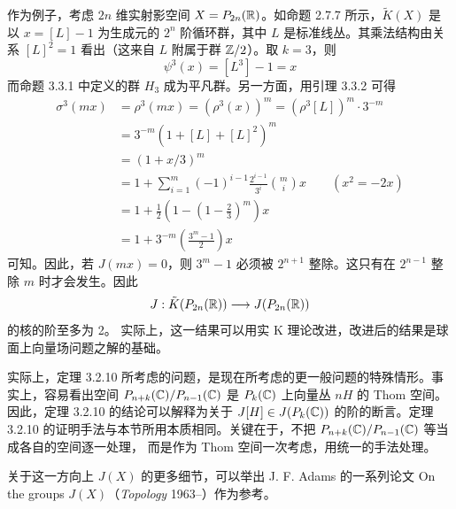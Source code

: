 作为例子，考虑 $2n$ 维实射影空间 $X=P_{2n}(\mathbb{R})$。如命题 2.7.7 所示，$\tilde K(X)$ 是以 $x=[L]-1$ 为生成元的 $2^n$ 阶循环群，其中 $L$ 是标准线丛。其乘法结构由关系 $[L]^2=1$ 看出（这来自 $L$ 附属于群 $\mathbb{Z}/2$）。取 $k=3$，则
\begin{equation*}
  \psi^3(x)=[L^3]-1=x
\end{equation*}
而命题 3.3.1 中定义的群 $H_3$ 成为平凡群。另一方面，用引理 3.3.2 可得
\begin{align*}
  \sigma^3(mx) &= \rho^3(mx)=(\rho^3(x))^m=(\rho^3[L])^m\cdot3^{-m} \\
  &= 3^{-m}(1+[L]+[L]^2)^m \\
  &= (1+x/3)^m \\
  &= 1+\sum_{i=1}^{m}(-1)^{i-1}\frac{2^{i-1}}{3^i}\binom{m}{i}x
    \qquad (x^2=-2x) \\
  &= 1+\frac12\left(1-\left(1-\frac23\right)^m\right)x \\
  &= 1+3^{-m}\left(\frac{3^m-1}{2}\right)x
\end{align*}
可知。因此，若 $J(mx)=0$，则 $3^m-1$ 必须被 $2^{n+1}$ 整除。这只有在 $2^{n-1}$ 整除 $m$ 时才会发生。因此
\begin{equation*}
  J:\tilde K(P_{2n}(\mathbb{R}))\longrightarrow J(P_{2n}(\mathbb{R}))
\end{equation*}
的核的阶至多为 2。
实际上，这一结果可以用实 K 理论改进，改进后的结果是球面上向量场问题之解的基础。

实际上，定理 3.2.10 所考虑的问题，是现在所考虑的更一般问题的特殊情形。事实上，容易看出空间 $P_{n+k}(\mathbb{C})/P_{n-1}(\mathbb{C})$ 是 $P_k(\mathbb{C})$ 上向量丛 $nH$ 的 Thom 空间。因此，定理 3.2.10 的结论可以解释为关于 $J[H]\in J(P_k(\mathbb{C}))$ 的阶的断言。定理 3.2.10 的证明手法与本节所用本质相同。关键在于，不把 $P_{n+k}(\mathbb{C})/P_{n-1}(\mathbb{C})$ 等当成各自的空间逐一处理，
而是作为 Thom 空间一次考虑，用统一的手法处理。

关于这一方向上 $J(X)$ 的更多细节，可以举出 J. F. Adams 的一系列论文 On the groups $J(X)$（\textit{Topology} 1963--）作为参考。

